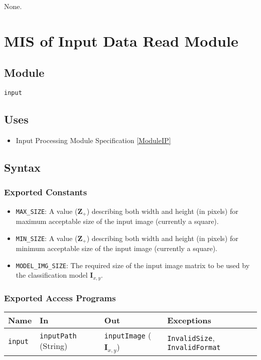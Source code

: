 \documentclass[12pt, titlepage]{article}
\def\code#1{\texttt{#1}}
\begin{document}
None.

\section{MIS of Input Data Read Module} \label{ModuleIDR} 

\subsection{Module}

\code{input}

\subsection{Uses}

\begin{itemize}
  \item Input Processing Module Specification \ref{ModuleIP}
\end{itemize}

\subsection{Syntax}

\subsubsection{Exported Constants}

\begin{itemize}
  \item \code{MAX\_SIZE}: A value ($\mathbf{Z}_{+}$) describing both width and height (in pixels) for maximum acceptable 
size of the input image (currently a square).
  \item \code{MIN\_SIZE}: A value ($\mathbf{Z}_{+}$) describing both width and height (in pixels) for minimum acceptable 
size of the input image (currently a square).
  \item \code{MODEL\_IMG\_SIZE}: The required size of the input image matrix to be used by the classification model $\mathbf{I}_{x,y}$.
\end{itemize}

\subsubsection{Exported Access Programs}

\begin{center}
\begin{tabular}{p{2cm} p{4cm} p{4cm} p{2cm}}
\hline
\textbf{Name} & \textbf{In} & \textbf{Out} & \textbf{Exceptions} \\
\hline
\code{input} & \code{inputPath} (String) & \code{inputImage} ($\mathbf{I}_{x,y}$) & \code{InvalidSize}, \code{InvalidFormat} \\
\hline
\end{tabular}
\end{center}
\end{document}
